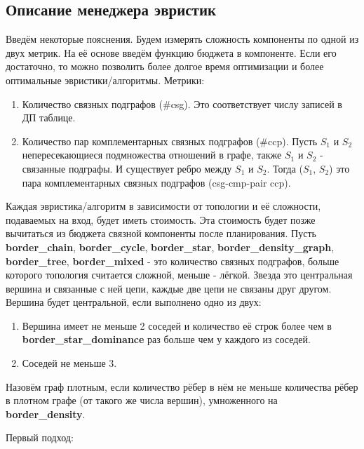 \documentclass[12pt]{article}
\begin{document}
\begin{flushleft}
\section*{Описание менеджера эвристик}

Введём некоторые пояснения.
\newline
Будем измерять сложность компоненты по одной из двух метрик. На её основе введём функцию бюджета в компоненте. Если его достаточно, 
то можно позволить более долгое время оптимизации и более оптимальные эвристики/алгоритмы.
Метрики:
\begin{enumerate}
    \item Количество связных подграфов (\#csg). Это соответствует числу записей в ДП таблице.
    \item Количество пар комплементарных связных подграфов (\#ccp). Пусть $S_1$ и $S_2$ непересекающиеся подмножества отношений в графе, также $S_1$ и $S_2$ - связанные 
    подграфы. И существует ребро между $S_1$ и $S_2$. Тогда  ($S_1$, $S_2$) это пара комплементарных связных подграфов (csg-cmp-pair  ccp).
\end{enumerate}
Каждая эвристика/алгоритм в зависимости от топологии и её сложности, подаваемых на вход, будет иметь стоимость. Эта стоимость будет позже вычитаться из бюджета связной компоненты после планирования. 
\newline
Пусть \textbf{border\_chain}, \textbf{border\_cycle}, \textbf{border\_star}, \textbf{border\_density\_graph}, \textbf{border\_tree}, \textbf{border\_mixed} - это количество связных подграфов, больше которого топология считается сложной, меньше - лёгкой.
\newline
Звезда это центральная вершина и связанные с ней цепи, каждые две цепи не связаны друг другом.
Вершина будет центральной, если выполнено одно из двух:
\begin{enumerate}
    \item Вершина имеет не меньше 2 соседей и количество её строк более чем в \textbf{border\_star\_dominance} раз больше чем у каждого из соседей.
    \item Соседей не меньше 3.
\end{enumerate}

Назовём граф плотным, если количество рёбер в нём не меньше количества рёбер в плотном графе (от такого же числа вершин), умноженного на \textbf{border\_density}.
\newline

\begin{center}
Первый подход:
\end{center}


\end{flushleft}
\end{document}
